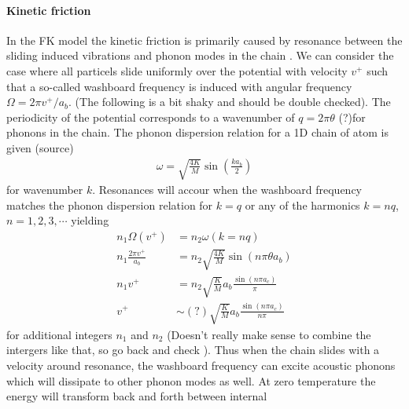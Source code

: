 \paragraph*{Kinetic friction}





In the FK model the kinetic friction is primarily caused by resonance between
the sliding induced vibrations and phonon modes in the chain \cite{FK2D}. We
can consider the case where all particels slide uniformly over the potential
with velocity $v^+$ such that a so-called washboard frequency is induced with angular frequency $\Omega = 2\pi v^+ / a_b$. (The following is a bit shaky and should be double checked). The periodicity of the potential corresponds to a wavenumber of $q = 2\pi \theta$ (?)for phonons in the chain. The phonon dispersion relation for a 1D chain of atom is given (source)
\begin{align*}
  \omega =\sqrt{\frac{4 K}{M}} \sin{\left(\frac{k a_b}{2}\right)}
\end{align*}
for wavenumber $k$. Resonances will accour when the washboard frequency matches the phonon dispersion relation for $k = q$ or any of the harmonics $k = nq$, $n = 1, 2, 3, \cdots$ yielding
\begin{align*}
  n_1 \Omega(v^+) &= n_2 \omega(k=nq) \\
  n_1 \frac{2\pi v^+}{a_b} &= n_2 \sqrt{\frac{4 K}{M}} \sin{(n\pi \theta a_b)} \\
  n_1 v^+ &= n_2 \sqrt{\frac{K}{M}} a_b\frac{\sin{(n\pi a_c)}}{\pi} \\
  v^+ &\sim (?) \sqrt{\frac{K}{M}} a_b\frac{\sin{(n\pi a_c)}}{n\pi}
\end{align*}
for additional integers $n_1$ and $n_2$ (Doesn't really make sense to combine the intergers like that, so go back and check \cite{FK2D}). Thus when the chain slides with a velocity around resonance, the washboard frequency can excite acoustic phonons which will dissipate to other phonon modes as well.
At zero temperature the energy will transform back and forth between internal
